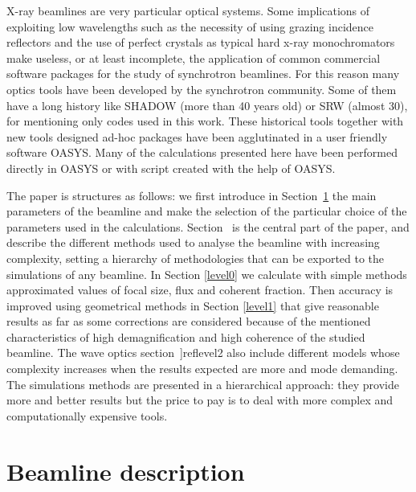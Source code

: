 \documentclass{iucr}              %
\begin{document}
X-ray beamlines are very particular optical systems. Some implications of exploiting low wavelengths such as the necessity of using grazing incidence reflectors and the use of perfect crystals as typical hard x-ray monochromators make useless, or at least incomplete, the application of common commercial software packages for the study of synchrotron beamlines. For this reason many optics tools have been developed by the synchrotron community. Some of them have a long history like SHADOW (more than 40 years old) or SRW (almost 30), for mentioning only codes used in this work. These historical tools together with new tools designed ad-hoc packages have been agglutinated in a user friendly software OASYS. Many of the calculations presented here have been performed directly in OASYS or with script created with the help of OASYS. 


The paper is structures as follows: we first introduce in Section~\ref{Beamline description} the main parameters of the beamline and make the selection of the particular choice of the parameters used in the calculations. Section~\label{Simulations} is the central part of the paper, and describe the different methods used to analyse the beamline with increasing complexity, setting a hierarchy of methodologies that can be exported to the simulations of any beamline. In Section \ref{level0} we calculate with simple methods approximated values of focal size, flux and coherent fraction. Then accuracy is improved using geometrical methods in Section \ref{level1} that give reasonable results as far as some corrections are considered because of the  mentioned characteristics of high demagnification and high coherence of the studied beamline. The wave optics section~]ref{level2} also include different models whose complexity increases when the results expected are more and mode demanding. The simulations methods are presented in a hierarchical approach:  they provide more and better results but the price to pay is to deal with more complex and computationally expensive tools. 


\section{Beamline description}
\label{Beamline description}
\end{document}

